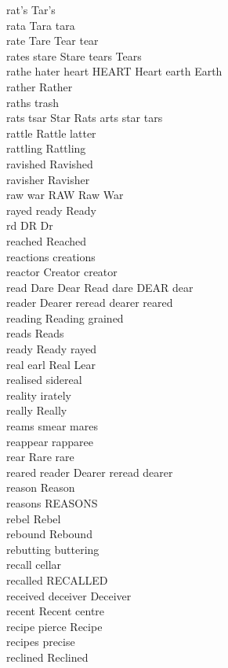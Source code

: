 rat's Tar's\\
rata Tara tara\\
rate Tare Tear tear\\
rates stare Stare tears Tears\\
rathe hater heart HEART Heart earth Earth\\
rather Rather\\
raths trash\\
rats tsar Star Rats arts star tars\\
rattle Rattle latter\\
rattling Rattling\\
ravished Ravished\\
ravisher Ravisher\\
raw war RAW Raw War\\
rayed ready Ready\\
rd DR Dr\\
reached Reached\\
reactions creations\\
reactor Creator creator\\
read Dare Dear Read dare DEAR dear\\
reader Dearer reread dearer reared\\
reading Reading grained\\
reads Reads\\
ready Ready rayed\\
real earl Real Lear\\
realised sidereal\\
reality irately\\
really Really\\
reams smear mares\\
reappear rapparee\\
rear Rare rare\\
reared reader Dearer reread dearer\\
reason Reason\\
reasons REASONS\\
rebel Rebel\\
rebound Rebound\\
rebutting buttering\\
recall cellar\\
recalled RECALLED\\
received deceiver Deceiver\\
recent Recent centre\\
recipe pierce Recipe\\
recipes precise\\
reclined Reclined\\
